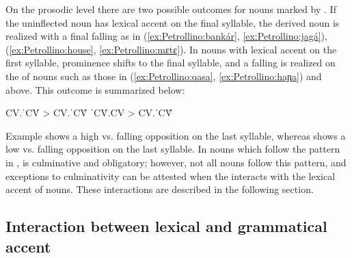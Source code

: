 \documentclass[output=paper,modfonts,nonflat,hidelinks]{langsci/langscibook}
\begin{document}
On the prosodic level there are two possible outcomes for nouns marked by  . If the uninflected noun has lexical accent on the final syllable, the derived  noun is realized with a final falling  as in (\ref{ex:Petrollino:bankár}, \ref{ex:Petrollino:jagá}), (\ref{ex:Petrollino:house}, \ref{ex:Petrollino:mɛtɛ}). In nouns with lexical accent on the first syllable, prominence shifts to the final syllable, and a falling  is realized on the  of nouns such as those in (\ref{ex:Petrollino:qasa}, \ref{ex:Petrollino:haɲa}) and  above. This outcome is summarized below:

\begin{exe}
\ex \begin{xlist} \label{ex:Petrollino:35}
\ex \label{CV.CV̂} CV.ˈCV́ > CV.ˈCV̂ \label{ex:Petrollino:35a}
\ex ˈCV́.CV > CV.ˈCV̂ \label{ex:Petrollino:35b}
\end{xlist}
\end{exe}
Example  shows a high vs. falling opposition on the last syllable, whereas  shows a low vs. falling opposition on the last syllable. In  nouns which follow the pattern in ,  is culminative and obligatory; however, not all nouns follow this pattern, and exceptions to culminativity can be attested when the  interacts with the lexical accent of nouns. These interactions are described in the following section.

\subsection{Interaction between lexical and grammatical accent} \label{sec:Petrollino:interaction}
\end{document}
